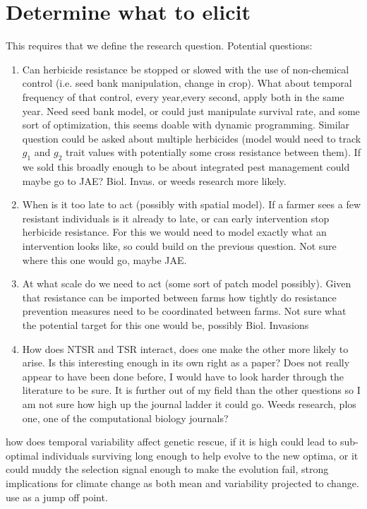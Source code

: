 \documentclass[12pt, a4paper]{article}
\begin{document}
\section{Determine what to elicit}
This requires that we define the research question.
Potential questions:
\begin{enumerate}
	\item Can herbicide resistance be stopped or slowed with the use of non-chemical control (i.e. seed bank manipulation, change in crop). What about temporal frequency of that control, every year,every second, apply both in the same year. Need seed bank model, or could just manipulate survival rate, and some sort of optimization, this seems doable with dynamic programming. Similar question could be asked about multiple herbicides (model would need to track $g_1$ and $g_2$ trait values with potentially some cross resistance between them). If we sold this broadly enough to be about integrated pest management could maybe go to JAE? Biol. Invas. or weeds research more likely.     
	\item When is it too late to act (possibly with spatial model). If a farmer sees a few resistant individuals is it already to late, or can early intervention stop herbicide resistance. For this we would need to model exactly what an intervention looks like, so could build on the previous question. Not sure where this one would go, maybe JAE.  
	\item At what scale do we need to act (some sort of patch model possibly). Given that resistance can be imported between farms how tightly do resistance prevention measures need to be coordinated between farms. Not sure what the potential target for this one would be, possibly Biol. Invasions    
	\item How does NTSR and TSR interact, does one make the other more likely to arise. Is this interesting enough in its own right as a paper? Does not really appear to have been done before, I would have to look harder through the literature to be sure. It is further out of my field than the other questions so I am not sure how high up the journal ladder it could go. Weeds research, plos one, one of the computational biology journals?  
\end{enumerate}
	\item how does temporal variability affect genetic rescue, if it is high could lead to sub-optimal individuals surviving long enough to help evolve to the new optima, or it could muddy the selection signal enough to make the evolution fail, strong implications for climate change as both mean and variability projected to change. use \cite{Gomu2010} as a jump off point. 
\end{document}

